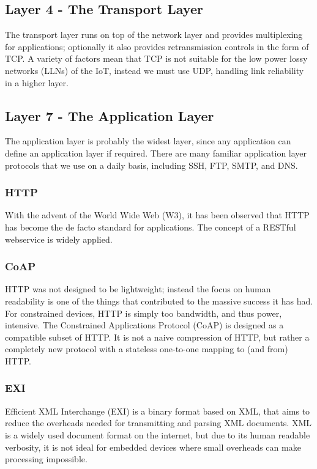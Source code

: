 \documentclass[10pt,journal,compsoc]{IEEEtran}
\begin{document}
\subsection{Layer 4 - The Transport Layer}
The transport layer runs on top of the network layer and provides multiplexing
for applications; optionally it also provides retransmission controls in the
form of TCP. A variety of factors mean that TCP is not suitable for the
low power lossy networks (LLNs) of the IoT, instead we must use UDP,
handling link reliability in a higher layer.

\subsection{Layer 7 - The Application Layer}
The application layer is probably the widest layer, since any application can
define an application layer if required. There are many familiar
application layer protocols that we use on a daily basis, including SSH,
FTP, SMTP, and DNS. 

\subsubsection{HTTP} 
With the advent of the World Wide Web (W3), it has been observed that HTTP has
become the de facto standard for applications. The concept of a RESTful
webservice is widely applied.  

\subsubsection{CoAP}
HTTP was not designed to be lightweight; instead the focus on human readability
is one of the things that contributed to the massive success it has had. For
constrained devices, HTTP is simply too bandwidth, and thus power, intensive.
The Constrained Applications Protocol (CoAP) is designed as a compatible subset
of HTTP. It is not a naive compression of HTTP, but rather a completely new
protocol with a stateless one-to-one mapping to (and from) HTTP. 

\subsubsection{EXI}
Efficient XML Interchange (EXI) is a binary format based on XML, that aims to
reduce the overheads needed for transmitting and parsing XML documents. XML is
a widely used document format on the internet, but due to its human readable
verbosity, it is not ideal for embedded devices where small overheads can make
processing impossible. 
\end{document}
